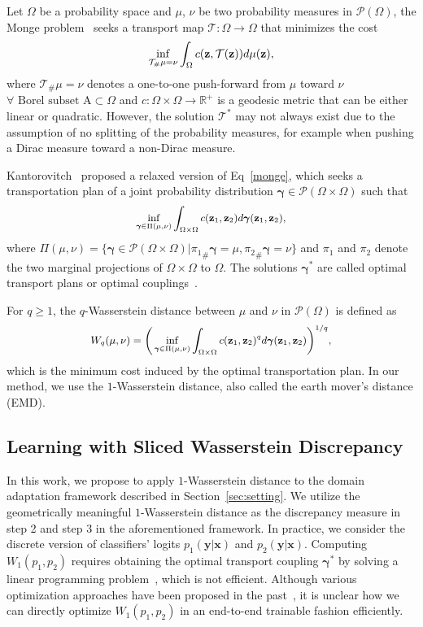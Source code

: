 \documentclass[10pt,twocolumn,letterpaper]{article}
\newcommand{\T}{{\mathcal{T}}}
\newcommand{\Tmus}{{\T_{\#}}{\mu}}
\newcommand{\x}{{\bf z}}
\newcommand{\dist}[1]{c(#1)}
\newcommand{\G}{{\boldsymbol{\gamma}}}
\newcommand{\proba}[1]{\mathcal{P}(#1)}
\newcommand{\Gzero}{{\boldsymbol{\gamma}}^*}
\begin{document}
Let $\Omega$ be a probability space and $\mu$, $\nu$ be two probability measures in $\mathcal{P}(\Omega)$, the Monge problem~\cite{monge1781memoire} seeks a transport map $\T:\Omega\rightarrow\Omega$ that minimizes the cost
\begin{equation}
\label{monge}
\small
\inf_{\Tmus=\nu}  \int_{\Omega} \dist{\x,\T(\x)}d\mu(\x),
\end{equation}
where  $\Tmus=\nu$ denotes a one-to-one push-forward from $\mu$ toward $\nu$ $\forall \text{ Borel subset A} \subset \Omega$ and $c: \Omega \times \Omega \rightarrow \mathbb{R}^+$ is a geodesic metric that can be either linear or quadratic. However, the  solution $\T^*$ may not always exist due to the assumption of no splitting of the probability measures, for example when pushing a Dirac measure toward a non-Dirac measure.

Kantorovitch~\cite{kantorovitch1958translocation} proposed a relaxed version of Eq~\ref{monge}, which seeks a transportation plan of a joint probability distribution $\G \in \proba{\Omega \times \Omega}$ such that
\begin{equation}
\small
\inf_{\G \in \Pi(\mu,\nu)}  \int_{\Omega\times\Omega} c(\x_1,\x_2)d\G(\x_1,\x_2),
\end{equation}
where  $\Pi(\mu,\nu)=\{\G \in \proba{\Omega \times \Omega} | {\pi_1}_\# \G=\mu, {\pi_2}_{\#} \G=\nu\}$ and $\pi_1$ and $\pi_2$ denote the two marginal projections of 
$\Omega \times \Omega$ to $\Omega$. The solutions $\Gzero$ are called optimal transport plans or optimal couplings~\cite{villani2009optimal}.


For $q \geq 1$, the $q$-Wasserstein distance between $\mu$ and $\nu$ in $\mathcal{P}(\Omega)$ is defined as
\begin{equation}
\small
 W_q(\mu, \nu) = \bigg(  \inf_{\G \in \Pi(\mu,\nu)}  \int_{\Omega\times\Omega} c(\x_1,\x_2)^q d\G(\x_1,\x_2) \bigg)^{1/q},
\end{equation}
which is the minimum cost induced by the optimal transportation plan. 
In our method, we use the $1$-Wasserstein distance, also called the earth mover's distance (EMD).


\subsection{Learning with Sliced Wasserstein Discrepancy}
\label{sec:wd}
In this work, we propose to apply $1$-Wasserstein distance to the domain adaptation framework described in Section~\ref{sec:setting}. We utilize the geometrically meaningful $1$-Wasserstein distance as the discrepancy measure in step 2 and step 3 in the aforementioned framework.
In practice, we consider the discrete version of classifiers' logits $p_1(\mathbf{y}|\mathbf{x})$ and $p_2(\mathbf{y}|\mathbf{x})$. Computing $W_1(p_1, p_2)$ requires obtaining the optimal transport coupling $\Gzero$ by solving a linear programming problem~\cite{kantorovitch1958translocation}, which is not efficient.
Although various optimization approaches have been proposed in the past~\cite{cuturi2013sinkhorn, frogner2015learning}, it is unclear how we can directly optimize $W_1(p_1, p_2)$ in an end-to-end trainable fashion efficiently.
\end{document}
